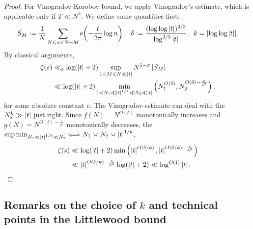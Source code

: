 \begin{proof}
For Vinogradov-Korobov bound, we apply Vinogradov's estimate, which is applicable only if $T \ll N^k$. We define some quantities first: $$S_M := \frac{1}{N} \sum_{N \leqslant n < N+M} \operatorname{e} \! \left( - \frac{t}{2\pi} \log n \right), \;\; \delta := \frac{(\log\log \left\lvert t \right\rvert)^{2/3}}{\log^{2/3} \left\lvert t \right\rvert}, \;\; k = [\log \log \left\lvert t \right\rvert].$$
By classical arguments,
\begin{align*}
    \zeta(s) &\ll_\varepsilon \log(\left\lvert t \right\rvert+2) \sup_{1 < M \leqslant N \ll \left\lvert t \right\rvert} N^{1-\sigma} \left\lvert S_M \right\rvert \\
    &\ll \log(\left\lvert t \right\rvert+2) \min_{1 < N_1 \ll \left\lvert t \right\rvert^{1/k} \ll N_2 \ll \left\lvert t \right\rvert} \left( N_1^{O(\delta)}, N_2^{O(\delta)-\frac{c}{k^2}} \right),
\end{align*}
for some absolute constant $c$. The Vinogradov-estimate can deal with the $N_2^k \gg \left\lvert t \right\rvert$ just right. Since $f(N) = N^{O(\delta)}$ monotonically increases and $g(N) = N^{O(\delta)-\frac{c}{k^2}}$ monotonically decreases, the $\sup \min_{N_1 \ll \left\lvert t \right\rvert^{1/k} \ll N_2} \Longleftrightarrow N_1 \asymp N_2 \asymp \left\lvert t \right\rvert^{1/k}$.
\begin{align*}
    \zeta(s) &\ll \log(\left\lvert t \right\rvert+2) \min \left( \left\lvert t \right\rvert^{O(\delta/k)}, \left\lvert t \right\rvert^{O(\delta/k)-\frac{c}{k^3}} \right) \\
    &\ll \left\lvert t \right\rvert^{O(\delta/k)-\frac{c}{k^3}} \log(\left\lvert t \right\rvert+2) \ll \log^{O(1)} \left\lvert t \right\rvert.
\end{align*}
\end{proof}

\subsection{Remarks on the choice of $k$ and technical points in the Littlewood bound}

